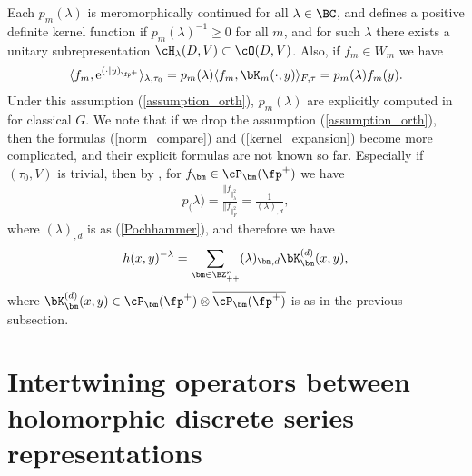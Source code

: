 Each $p_m(\lambda)$ is meromorphically continued for all $\lambda\in\BC$, and defines a positive definite kernel function if
$p_m(\lambda)^{-1}\ge 0$ for all $m$, and for such $\lambda$ there exists a unitary subrepresentation $\cH_\lambda(D,V)\subset\cO(D,V)$.
Also, if $f_m\in W_m$ we have
\begin{gather}\label{exp_onD}
\langle f_m,{\rm e}^{(\cdot|y)_{\fp^+}}\rangle_{\lambda,\tau_0}=p_m(\lambda)\langle f_m,\bK_m(\cdot,y)\rangle_{F,\tau}=p_m(\lambda)f_m(y).
\end{gather}
Under this assumption (\ref{assumption_orth}), $p_m(\lambda)$ are explicitly computed in \cite{N2} for classical $G$.
We note that if we drop the assumption (\ref{assumption_orth}), then the formulas (\ref{norm_compare}) and (\ref{kernel_expansion}) become
more complicated, and their explicit formulas are not known so far.
Especially if $(\tau_0,V)$ is trivial,
then by \cite[Part~III, Corollary~V.3.9]{FKKLR}, \cite{FK0} for $f_\bm\in\cP_\bm(\fp^+)$ we have
\begin{gather}\label{scalar_norm}
p_\bm(\lambda)=\frac{\Vert f_\bm\Vert_\lambda^2}{\Vert f_\bm\Vert_F^2}=\frac{1}{(\lambda)_{\bm,d}},
\end{gather}
where $(\lambda)_{\bm,d}$ is as (\ref{Pochhammer}), and therefore we have
\begin{gather}\label{ext_of_h}
h(x,y)^{-\lambda}=\sum_{\bm\in\BZ_{++}^r}(\lambda)_{\bm,d}\bK_\bm^{(d)}(x,y),
\end{gather}
where $\bK_\bm^{(d)}(x,y)\in\cP_\bm(\fp^+)\otimes \overline{\cP_\bm(\fp^+)}$ is as in the previous subsection.

\section[Intertwining operators between holomorphic discrete series representations]{Intertwining operators between holomorphic discrete series\\ representations}\label{section3}
